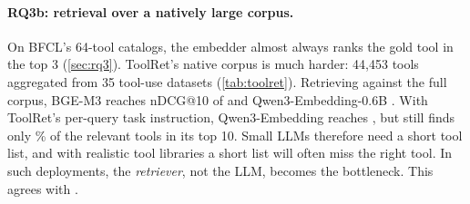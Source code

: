 \paragraph{RQ3b: retrieval over a natively large corpus.}
On BFCL's 64-tool catalogs, the embedder almost always ranks the gold tool in the top 3 (\cref{sec:rq3}). ToolRet's native corpus is much harder: 44{,}453 tools aggregated from 35 tool-use datasets (\cref{tab:toolret}).
Retrieving against the full corpus, BGE-M3 reaches nDCG@10 of \TrNdcgBge{} and Qwen3-Embedding-0.6B \TrNdcgQwenGen{}. With ToolRet's per-query task instruction, Qwen3-Embedding reaches \TrNdcgQwenTask, but still finds only \TrRecallQwenTaskKTen\% of the relevant tools in its top 10.
Small LLMs therefore need a short tool list, and with realistic tool libraries a short list will often miss the right tool. In such deployments, the \emph{retriever}, not the LLM, becomes the bottleneck. This agrees with \citet{shi2025toolret}.

\begin{table}[t]
  \centering
  \caption{RQ3b: retrieval on ToolRet's full native corpus (44{,}453 tools; 600 queries, 200 per category). Recall is the share of a query's relevant tools that are retrieved, averaged over queries.}
  \label{tab:toolret}
  \small
  
\end{table}
